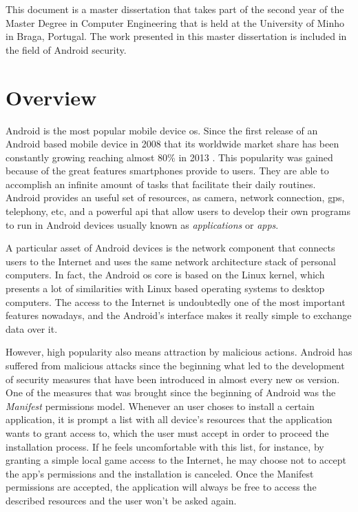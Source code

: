 This document is a master dissertation that takes part of the second year of the Master Degree in Computer Engineering that is held at the University of Minho in Braga, Portugal. The work presented in this master dissertation is included in the field of Android security.

\section{Overview}
\label{sec:overview}

Android is the most popular mobile device \gls{os}. Since the first release of an Android based mobile device in 2008 that its worldwide market share has been constantly growing reaching almost 80\% in 2013 \cite{Gartner:Android}. This popularity was gained because of the great features smartphones provide to users. They are able to accomplish an infinite amount of tasks that facilitate their daily routines. Android provides an useful set of resources, as camera, network connection, \gls{gps}, telephony, etc, and a powerful \gls{api} that allow users to develop their own programs to run in Android devices usually known as \textit{applications} or \textit{apps}.

A particular asset of Android devices is the network component that connects users to the Internet and uses the same network architecture stack of personal computers. In fact, the Android \gls{os} core is based on the Linux kernel, which presents a lot of similarities with Linux based operating systems to desktop computers. The access to the Internet is undoubtedly one of the most important features nowadays, and the Android's interface makes it really simple to exchange data over it.

However, high popularity also means attraction by malicious actions. Android has suffered from malicious attacks since the beginning what led to the development of security measures that have been introduced in almost every new \gls{os} version. One of the measures that was brought since the beginning of Android was the \textit{Manifest} permissions model. Whenever an user choses to install a certain application, it is prompt a list with all device's resources that the application wants to grant access to, which the user must accept in order to proceed the installation process. If he feels uncomfortable with this list, for instance, by granting a simple local game access to the Internet, he may choose not to accept the app's permissions and the installation is canceled. Once the Manifest permissions are accepted, the application will always be free to access the described resources and the user won't be asked again.

